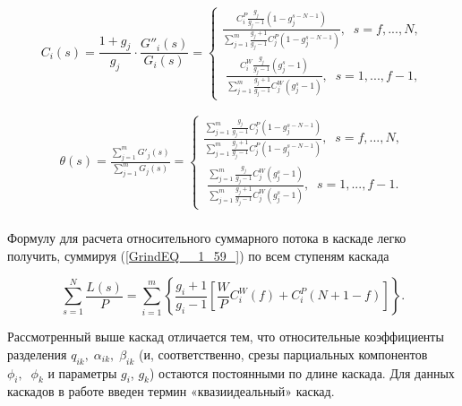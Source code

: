 \begin{equation} \label{GrindEQ__1_60_} 
C_{i} (s)=\frac{1+g_{j} }{g_{j} } \cdot \frac{G''_{i} (s)}{G_{i} (s)} =\left\{\begin{array}{l} {\frac{C_{i}^{P} \frac{g_{j} }{g_{j} -1} \left(1-g_{j}^{s-N-1} \right)}{\sum _{j=1}^{m}\frac{g_{j} +1}{g_{j} -1}  C_{j}^{P} \left(1-g_{j}^{s-N-1} \right)} ,\; \; s=f,...,N,} \\ {\; \frac{C_{i}^{W} \frac{g_{j} }{g_{j} -1} \left(g_{j}^{s} -1\right)}{\sum _{j=1}^{m}\frac{g_{j} +1}{g_{j} -1}  C_{j}^{W} \left(g_{j}^{s} -1\right)} ,\; \; s=1,...,f-1,} \end{array}\right.  
\end{equation} 

\begin{equation} \label{GrindEQ__1_61_} 
\begin{array}{l} {\theta (s)=\frac{\sum _{j=1}^{m}G'_{j} (s) }{\sum _{j=1}^{m}G_{j} (s) } =\left\{\begin{array}{l} {\frac{\sum _{j=1}^{m}\frac{g_{j} }{g_{j} -1} C_{j}^{P} \left(1-g_{j}^{s-N-1} \right) }{\sum _{j=1}^{m}\frac{g_{j} +1}{g_{j} -1}  C_{j}^{P} \left(1-g_{j}^{s-N-1} \right)} ,\; \; s=f,...,N,} \\ {\; \frac{\sum _{j=1}^{m}\frac{g_{j} }{g_{j} -1} C_{j}^{W} \left(g_{j}^{s} -1\right) }{\sum _{j=1}^{m}\frac{g_{j} +1}{g_{j} -1}  C_{j}^{W} \left(g_{j}^{s} -1\right)} ,\; \; s=1,...,f-1.} \end{array}\right. } \\ {\; } \end{array} 
\end{equation}

Формулу для расчета относительного суммарного потока в каскаде легко получить, суммируя (\ref{GrindEQ__1_59_}) по всем ступеням каскада

\begin{equation} \label{GrindEQ__1_62_} 
  \sum _{s=1}^{N}\frac{L(s)}{P} =\sum _{i=1}^{m}\left\{\frac{g_{i} +1}{g_{i} -1} \left[\frac{W}{P} C_{i}^{W} (f)+C_{i}^{P} \left(N+1-f\right)\right]\right\}  .   
\end{equation} 
  

Рассмотренный выше каскад отличается тем, что относительные коэффициенты разделения $q_{ik} ,\; \alpha _{ik} ,\; \beta _{ik} $ (и, соответственно, срезы парциальных компонентов $\phi _{i} ,\; \; \phi _{k} $ и параметры $g_{i} $, $g_{k} $) остаются постоянными по длине каскада. Для данных каскадов в работе \cite{sazykinKvaziidealnyeKaskadyDlya2000} введен термин «квазиидеальный» каскад.

